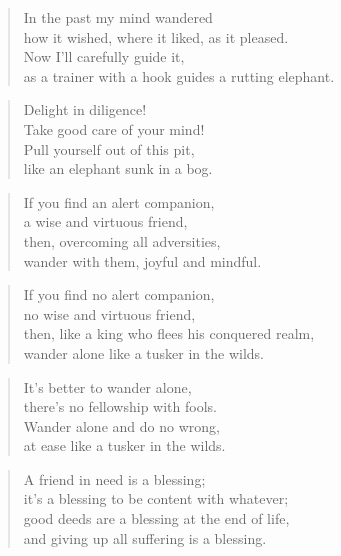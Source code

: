 \documentclass[12pt,openany]{book}%
\begin{document}
\begin{verse}%
In the past my mind wandered \\
how it wished, where it liked, as it pleased. \\
Now I’ll carefully guide it, \\
as a trainer with a hook guides a rutting elephant. 

%
\end{verse}

\begin{verse}%
Delight in diligence! \\
Take good care of your mind! \\
Pull yourself out of this pit, \\
like an elephant sunk in a bog. 

%
\end{verse}

\begin{verse}%
If you find an alert companion, \\
a wise and virtuous friend, \\
then, overcoming all adversities, \\
wander with them, joyful and mindful. 

%
\end{verse}

\begin{verse}%
If you find no alert companion, \\
no wise and virtuous friend, \\
then, like a king who flees his conquered realm, \\
wander alone like a tusker in the wilds. 

%
\end{verse}

\begin{verse}%
It’s better to wander alone, \\
there’s no fellowship with fools. \\
Wander alone and do no wrong, \\
at ease like a tusker in the wilds. 

%
\end{verse}

\begin{verse}%
A friend in need is a blessing; \\
it’s a blessing to be content with whatever; \\
good deeds are a blessing at the end of life, \\
and giving up all suffering is a blessing. 

%
\end{verse}
\end{document}
